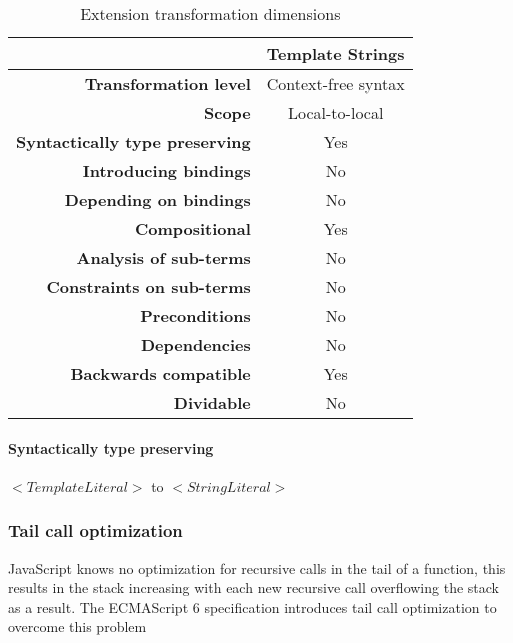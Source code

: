 \documentclass[10pt,a4paper]{article}
\begin{document}
\begin{table}[H]
\centering
\caption{Extension transformation dimensions}
\label{template-strings-table}
\begin{tabular}{@{}rc@{}}
\toprule
                                       & \multicolumn{1}{l}{\textbf{Template Strings}} \\ \midrule
\textbf{Transformation level}          & Context-free syntax                          \\
\textbf{Scope}                         & Local-to-local                               \\
\textbf{Syntactically type preserving} & Yes                                          \\
\textbf{Introducing bindings}          & No                                          \\%
\textbf{Depending on bindings}         & No                                           \\
\textbf{Compositional}                 & Yes                                          \\
\textbf{Analysis of sub-terms}          & No                                          \\
\textbf{Constraints on sub-terms}       & No                                           \\
\textbf{Preconditions}                 & No                                          \\
\textbf{Dependencies}                  & No                                           \\
\textbf{Backwards compatible}          & Yes                                          \\
\textbf{Dividable}                     & No                                           \\ \bottomrule
\end{tabular}
\end{table}

\paragraph{Syntactically type preserving}
$<TemplateLiteral>$ to $<StringLiteral>$

\subsubsection{Tail call optimization}
JavaScript knows no optimization for recursive calls in the tail of a function, this results in the stack increasing with each new recursive call overflowing the stack as a result.  The ECMAScript 6 specification introduces tail call optimization to overcome this problem\cite[14.6]{SpecJS}
\end{document}
